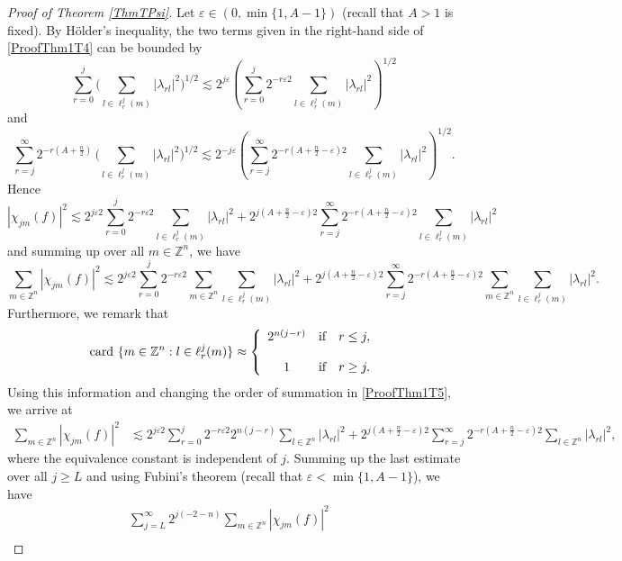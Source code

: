 \documentclass[11pt, a4paper,leqno]{amsart}
\theoremstyle{plain}
\numberwithin{equation}{section}
\theoremstyle{definition}
\theoremstyle{remark}
\begin{document}
\begin{proof}[Proof of Theorem \ref{ThmTPsi}]
Let $\varepsilon\in(0,\min\{1,A-1\})$ (recall that $A>1$ is fixed). By
H\"{o}lder's inequality, the two terms given in the right-hand side of
\eqref{ProofThm1T4} can be bounded by
\[
\sum_{r=0}^{j}\bigg(\sum_{l\in\ell_{r}^{j}(m)}|\lambda_{rl}|^{2}%
\bigg)^{1/2}\lesssim2^{j\varepsilon}\left(  \sum_{r=0}^{j}2^{-r\varepsilon
2}\sum_{l\in\ell_{r}^{j}(m)}|\lambda_{rl}|^{2}\right)  ^{1/2}%
\]
and
\[
\sum_{r=j}^{\infty}2^{-r(A+\frac{n}{2})}\,\bigg(\sum_{l\in\ell_{r}^{j}%
(m)}|\lambda_{rl}|^{2}\bigg)^{1/2}\lesssim2^{-j\varepsilon}\left(  \sum
_{r=j}^{\infty}2^{-r(A+\frac{n}{2}-\varepsilon)2}\sum_{l\in\ell_{r}^{j}%
(m)}|\lambda_{rl}|^{2}\right)  ^{1/2}.
\]
Hence
\[
|\chi_{jm}(f)|^{2}\lesssim2^{j\varepsilon2}\sum_{r=0}^{j}2^{-r\varepsilon
2}\sum_{l\in\ell_{r}^{j}(m)}|\lambda_{rl}|^{2}+2^{j(A+\frac{n}{2}%
-\varepsilon)2}\sum_{r=j}^{\infty}2^{-r(A+\frac{n}{2}-\varepsilon)2}\sum
_{l\in\ell_{r}^{j}(m)}|\lambda_{rl}|^{2}%
\]
and summing up over all $m\in\mathbb{Z}^{n}$, we have
\begin{equation}
\sum_{m\in\mathbb{Z}^{n}}|\chi_{jm}(f)|^{2}    \lesssim2^{j\varepsilon2}%
\sum_{r=0}^{j}2^{-r\varepsilon2}\sum_{m\in\mathbb{Z}^{n}}\sum_{l\in\ell
_{r}^{j}(m)}|\lambda_{rl}|^{2} +2^{j(A+\frac{n}{2}-\varepsilon)2}\sum_{r=j}^{\infty
}2^{-r(A+\frac{n}{2}-\varepsilon)2}\sum_{m\in\mathbb{Z}^{n}}\sum_{l\in\ell
_{r}^{j}(m)}|\lambda_{rl}|^{2}. \label{ProofThm1T5}%
\end{equation}
Furthermore, we remark that
\[
\text{card }\{m\in\mathbb{Z}^{n}:l\in\ell_{r}^{j}(m)\}\approx\left\{
\begin{array}
[c]{cl}%
2^{n(j-r)} & \text{if}\quad r\leq j,\\
& \\
1 & \text{if}\quad r\geq j.
\end{array}
\right.
\]
Using this information and changing the order of summation in
\eqref{ProofThm1T5}, we arrive at
\begin{align*}
\sum_{m\in\mathbb{Z}^{n}}|\chi_{jm}(f)|^{2}  &  \lesssim2^{j\varepsilon2}%
\sum_{r=0}^{j}2^{-r\varepsilon2}2^{n(j-r)}\sum_{l\in\mathbb{Z}^{n}}%
|\lambda_{rl}|^{2}+2^{j(A+\frac{n}{2}-\varepsilon)2}\sum_{r=j}^{\infty
}2^{-r(A+\frac{n}{2}-\varepsilon)2}\sum_{l\in\mathbb{Z}^{n}}|\lambda_{rl}%
|^{2},
\end{align*}
where the equivalence constant is independent of $j$. Summing up the last
estimate over all $j\geq L$ and using Fubini's theorem (recall that
$\varepsilon<\min\{1,A-1\}$), we have
\begin{align*}
\sum_{j=L}^{\infty}2^{j(-2-n)}\sum_{m\in\mathbb{Z}^{n}}|\chi_{jm}(f)|^{2}  & \\

\end{align*}
\end{proof}
\end{document}
